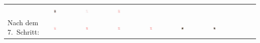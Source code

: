 \begin{tabular}{m{30mm}m{11mm}m{11mm}m{11mm}m{11mm}m{11mm}m{11mm}m{11mm}m{11mm}}
&
\includegraphics[width=0.08\textwidth]{./inf/SEKII/19_Java_Sortierverfahren/HerzKoenig.png}
&
\includegraphics[width=0.08\textwidth]{./inf/SEKII/19_Java_Sortierverfahren/HerzAs.png}
&
\includegraphics[width=0.08\textwidth]{./inf/SEKII/19_Java_Sortierverfahren/Herz9.png}
\\
Nach dem 7.\ Schritt: &
\includegraphics[width=0.08\textwidth]{./inf/SEKII/19_Java_Sortierverfahren/Herz7.png}
&
\includegraphics[width=0.08\textwidth]{./inf/SEKII/19_Java_Sortierverfahren/Herz8.png}
&
\includegraphics[width=0.08\textwidth]{./inf/SEKII/19_Java_Sortierverfahren/Herz9.png}
&
\includegraphics[width=0.08\textwidth]{./inf/SEKII/19_Java_Sortierverfahren/Herz10.png}
&
\includegraphics[width=0.08\textwidth]{./inf/SEKII/19_Java_Sortierverfahren/HerzBube.png}
&
\includegraphics[width=0.08\textwidth]{./inf/SEKII/19_Java_Sortierverfahren/HerzDame.png}

\end{tabular}
